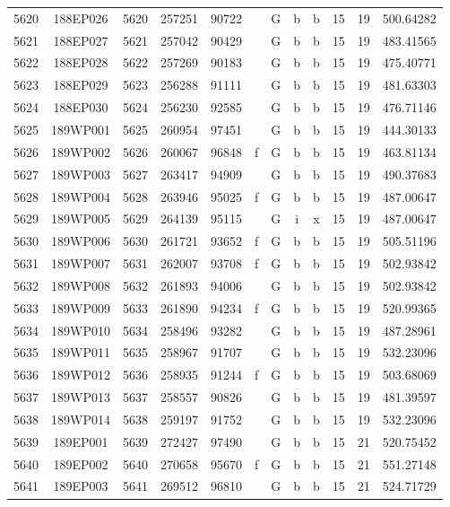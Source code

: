 \begin{tabular}{|*{12}{c|}}
5620 & 188EP026 & 5620 & 257251 & 90722 &  & G & b & b & 15 & 19 & 500.64282 \\ 
5621 & 188EP027 & 5621 & 257042 & 90429 &  & G & b & b & 15 & 19 & 483.41565 \\ 
5622 & 188EP028 & 5622 & 257269 & 90183 &  & G & b & b & 15 & 19 & 475.40771 \\ 
5623 & 188EP029 & 5623 & 256288 & 91111 &  & G & b & b & 15 & 19 & 481.63303 \\ 
5624 & 188EP030 & 5624 & 256230 & 92585 &  & G & b & b & 15 & 19 & 476.71146 \\ 
5625 & 189WP001 & 5625 & 260954 & 97451 &  & G & b & b & 15 & 19 & 444.30133 \\ 
5626 & 189WP002 & 5626 & 260067 & 96848 & f & G & b & b & 15 & 19 & 463.81134 \\ 
5627 & 189WP003 & 5627 & 263417 & 94909 &  & G & b & b & 15 & 19 & 490.37683 \\ 
5628 & 189WP004 & 5628 & 263946 & 95025 & f & G & b & b & 15 & 19 & 487.00647 \\ 
5629 & 189WP005 & 5629 & 264139 & 95115 &  & G & i & x & 15 & 19 & 487.00647 \\ 
5630 & 189WP006 & 5630 & 261721 & 93652 & f & G & b & b & 15 & 19 & 505.51196 \\ 
5631 & 189WP007 & 5631 & 262007 & 93708 & f & G & b & b & 15 & 19 & 502.93842 \\ 
5632 & 189WP008 & 5632 & 261893 & 94006 &  & G & b & b & 15 & 19 & 502.93842 \\ 
5633 & 189WP009 & 5633 & 261890 & 94234 & f & G & b & b & 15 & 19 & 520.99365 \\ 
5634 & 189WP010 & 5634 & 258496 & 93282 &  & G & b & b & 15 & 19 & 487.28961 \\ 
5635 & 189WP011 & 5635 & 258967 & 91707 &  & G & b & b & 15 & 19 & 532.23096 \\ 
5636 & 189WP012 & 5636 & 258935 & 91244 & f & G & b & b & 15 & 19 & 503.68069 \\ 
5637 & 189WP013 & 5637 & 258557 & 90826 &  & G & b & b & 15 & 19 & 481.39597 \\ 
5638 & 189WP014 & 5638 & 259197 & 91752 &  & G & b & b & 15 & 19 & 532.23096 \\ 
5639 & 189EP001 & 5639 & 272427 & 97490 &  & G & b & b & 15 & 21 & 520.75452 \\ 
5640 & 189EP002 & 5640 & 270658 & 95670 & f & G & b & b & 15 & 21 & 551.27148 \\ 
5641 & 189EP003 & 5641 & 269512 & 96810 &  & G & b & b & 15 & 21 & 524.71729 \\ 

\end{tabular}

